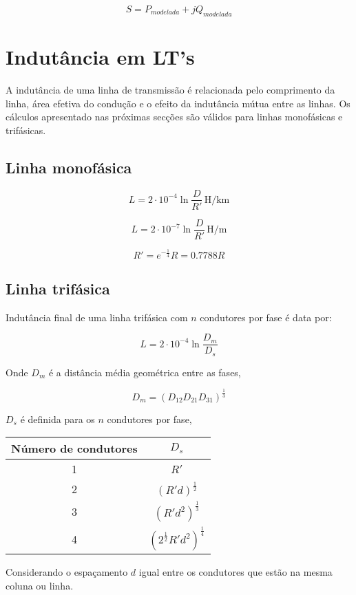 \documentclass[a4paper, 10pt, twocolumn]{article}
\newcommand{\unit}[1]{\ensuremath{\, \mathrm{#1}}}
\begin{document}
\begin{equation}
S = P_{modelada} + jQ_{modelada}  
\end{equation}

\section{Indutância em LT's}

A indutância de uma linha de transmissão é relacionada pelo
comprimento da linha, área efetiva do condução e o efeito da 
indutância mútua entre as linhas. Os cálculos apresentado nas
próximas secções são válidos para linhas monofásicas e trifásicas. 

\subsection{Linha monofásica}

\begin{equation}
L = 2 \cdot 10^{-4} \ln\frac{D}{R'} \unit{H/km}
\end{equation}
    
\begin{equation}
L = 2 \cdot 10^{-7} \ln\frac{D}{R'} \unit{H/m}
\end{equation}

\begin{equation}
R' = e^{-\frac{1}{4}}R = 0.7788R
\end{equation}

\subsection{Linha trifásica}
Indutância final de uma linha trifásica com $n$ condutores por fase é data por:

\begin{equation}
L = 2 \cdot 10^{-4} \ln\frac{D_m}{D_s}
\end{equation}

Onde $D_m$ é a distância média geométrica entre as fases,

\begin{equation}
D_m = (D_{12} D_{21} D_{31})^{\frac{1}{3}}
\end{equation}

$D_s$ é definida para os $n$ condutores por fase,
\begin{center}
\begin{tabular}{|c||c|}
    \hline
    Número de condutores & $D_s$ \\
    \hline
    1 & $R'$ \\
    2 & $(R' d)^{\frac{1}{2}}$ \\
    3 & $(R' d^2)^{\frac{1}{3}}$ \\
    4 & $(2^{\frac{1}{2}} R' d^2)^{\frac{1}{4}}$ \\ 
    \hline
\end{tabular}
\end{center}

Considerando o espaçamento $d$ igual entre os condutores que estão na mesma coluna ou linha.
\end{document}
